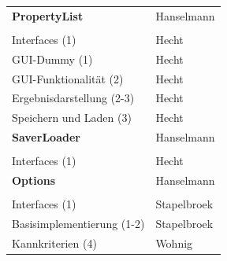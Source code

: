 \documentclass[a4paper]{scrreprt}
\begin{document}
\begin{tabular}{ | p{7cm} | p{7cm} |}
	\rule{0pt}{15pt}\textbf {PropertyList} & Hanselmann\\
	&\\
	\hline
	Interfaces (1) & Hecht\\
	\hline
	GUI-Dummy (1) & Hecht\\
	\hline
	GUI-Funktionalität (2) & Hecht\\
	\hline
	Ergebnisdarstellung (2-3) & Hecht\\
	\hline
	Speichern und Laden (3) & Hecht\\
	\hline
	\rule{0pt}{15pt}\textbf {SaverLoader} & Hanselmann\\
	&\\
	\hline
	Interfaces (1) & Hecht\\
	\hline
	\rule{0pt}{15pt}\textbf {Options} & Hanselmann\\
	&\\
	\hline
	Interfaces (1) & Stapelbroek\\
	\hline
	Basisimplementierung (1-2) & Stapelbroek\\
	\hline
	Kannkriterien (4) & Wohnig \\
	\hline
	
\end{tabular}\\
\\
\end{document}
